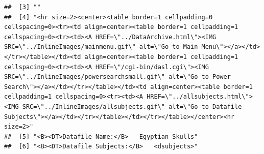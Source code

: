 \documentclass{beamer}\usepackage[]{graphicx}\usepackage[]{color}
\makeatletter
\newenvironment{kframe}{%
 \def\at@end@of@kframe{}%
 \ifinner\ifhmode%
  \def\at@end@of@kframe{\end{minipage}}%
  \begin{minipage}{\columnwidth}%
 \fi\fi%
 \def\FrameCommand##1{\hskip\@totalleftmargin \hskip-\fboxsep
 \colorbox{shadecolor}{##1}\hskip-\fboxsep
     \hskip-\linewidth \hskip-\@totalleftmargin \hskip\columnwidth}%
 \MakeFramed {\advance\hsize-\width
   \@totalleftmargin\z@ \linewidth\hsize
   \@setminipage}}%
 {\par\unskip\endMakeFramed%
 \at@end@of@kframe}
\newenvironment{knitrout}{}{} %
\makeatother
\begin{document}
\begin{frame}[fragile]
\begin{knitrout}
\begin{kframe}
\begin{verbatim}
##  [3] ""                                                                                                                                                                                                                                                                                                                                                                                                                                                                                                                                                                                                                                                                                                                              
##  [4] "<hr size=2><center><table border=1 cellpadding=0 cellspacing=0><tr><td align=center><table border=1 cellpadding=1 cellspacing=0><tr><td><A HREF=\"../DataArchive.html\"><IMG SRC=\"../InlineImages/mainmenu.gif\" alt=\"Go to Main Menu\"></a></td></tr></table></td><td align=center><table border=1 cellpadding=1 cellspacing=0><tr><td><A HREF=\"/cgi-bin/dasl.cgi\"><IMG SRC=\"../InlineImages/powersearchsmall.gif\" alt=\"Go to Power Search\"></a></td></tr></table></td><td align=center><table border=1 cellpadding=1 cellspacing=0><tr><td><A HREF=\"../allsubjects.html\"><IMG SRC=\"../InlineImages/allsubjects.gif\" alt=\"Go to Datafile Subjects\"></a></td></tr></table></td></tr></table></center><hr size=2>"
##  [5] "<B><DT>Datafile Name:</B>   Egyptian Skulls"                                                                                                                                                                                                                                                                                                                                                                                                                                                                                                                                                                                                                                                                                   
##  [6] "<B><DT>Datafile Subjects:</B>   <dsubjects>"                                                                                                                                                                                                                                                                                                                                                                                                                                                                                                                                                                                                                                                                                   

\end{verbatim}
\end{kframe}
\end{knitrout}
\end{frame}
\end{document}
